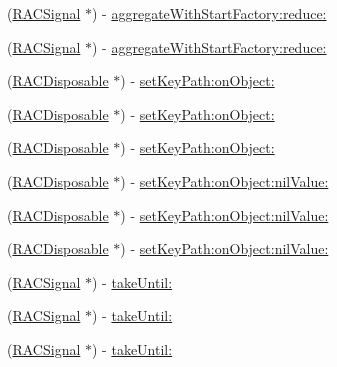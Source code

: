 \begin{DoxyCompactItemize}
\item 
(\mbox{\hyperlink{interface_r_a_c_signal}{R\+A\+C\+Signal}} $\ast$) -\/ \mbox{\hyperlink{interface_r_a_c_signal_a51c08c7a357f83c96c468a6aa13d4d87}{aggregate\+With\+Start\+Factory\+:reduce\+:}}
\item 
(\mbox{\hyperlink{interface_r_a_c_signal}{R\+A\+C\+Signal}} $\ast$) -\/ \mbox{\hyperlink{interface_r_a_c_signal_a51c08c7a357f83c96c468a6aa13d4d87}{aggregate\+With\+Start\+Factory\+:reduce\+:}}
\item 
(\mbox{\hyperlink{interface_r_a_c_disposable}{R\+A\+C\+Disposable}} $\ast$) -\/ \mbox{\hyperlink{interface_r_a_c_signal_ada2a2f51a30fb8bef13819c50ebfbf85}{set\+Key\+Path\+:on\+Object\+:}}
\item 
(\mbox{\hyperlink{interface_r_a_c_disposable}{R\+A\+C\+Disposable}} $\ast$) -\/ \mbox{\hyperlink{interface_r_a_c_signal_ada2a2f51a30fb8bef13819c50ebfbf85}{set\+Key\+Path\+:on\+Object\+:}}
\item 
(\mbox{\hyperlink{interface_r_a_c_disposable}{R\+A\+C\+Disposable}} $\ast$) -\/ \mbox{\hyperlink{interface_r_a_c_signal_ada2a2f51a30fb8bef13819c50ebfbf85}{set\+Key\+Path\+:on\+Object\+:}}
\item 
(\mbox{\hyperlink{interface_r_a_c_disposable}{R\+A\+C\+Disposable}} $\ast$) -\/ \mbox{\hyperlink{interface_r_a_c_signal_a3d59cca19be3e985aa5a08cb0386faeb}{set\+Key\+Path\+:on\+Object\+:nil\+Value\+:}}
\item 
(\mbox{\hyperlink{interface_r_a_c_disposable}{R\+A\+C\+Disposable}} $\ast$) -\/ \mbox{\hyperlink{interface_r_a_c_signal_a3d59cca19be3e985aa5a08cb0386faeb}{set\+Key\+Path\+:on\+Object\+:nil\+Value\+:}}
\item 
(\mbox{\hyperlink{interface_r_a_c_disposable}{R\+A\+C\+Disposable}} $\ast$) -\/ \mbox{\hyperlink{interface_r_a_c_signal_a3d59cca19be3e985aa5a08cb0386faeb}{set\+Key\+Path\+:on\+Object\+:nil\+Value\+:}}
\item 
(\mbox{\hyperlink{interface_r_a_c_signal}{R\+A\+C\+Signal}} $\ast$) -\/ \mbox{\hyperlink{interface_r_a_c_signal_afb214e9e69dc34880b306c118b8e56d4}{take\+Until\+:}}
\item 
(\mbox{\hyperlink{interface_r_a_c_signal}{R\+A\+C\+Signal}} $\ast$) -\/ \mbox{\hyperlink{interface_r_a_c_signal_afb214e9e69dc34880b306c118b8e56d4}{take\+Until\+:}}
\item 
(\mbox{\hyperlink{interface_r_a_c_signal}{R\+A\+C\+Signal}} $\ast$) -\/ \mbox{\hyperlink{interface_r_a_c_signal_afb214e9e69dc34880b306c118b8e56d4}{take\+Until\+:}}
\item 

\end{DoxyCompactItemize}
